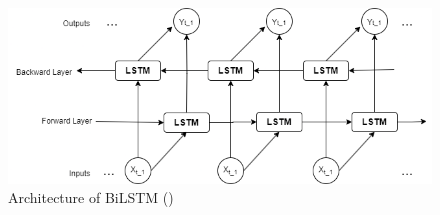 \documentclass[a4paper,fleqn]{cas-dc}
\begin{document}
\begin{figure}[h!]
  \centering
  \includegraphics[scale=0.6]{img/Bilstm}
  \caption{Architecture of BiLSTM (\cite{article})} \label{Bilstm}
\end{figure}
\end{document}
